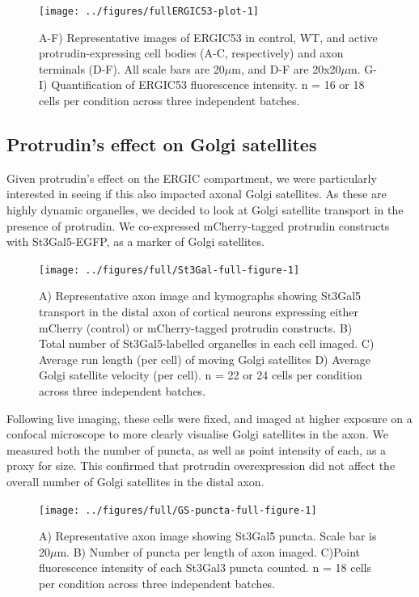 \documentclass[
  12pt,
  a4paper,
]{book}
\begin{document}
\begin{figure}
\texttt{[image: ../figures/fullERGIC53-plot-1]} \caption[ERGIC53 localisation in protrudin-expressing neurons]{A-F) Representative images of ERGIC53 in control, WT, and active protrudin-expressing cell bodies (A-C, respectively) and axon terminals (D-F).  All scale bars are 20$\mu$m, and D-F are 20x20$\mu$m.  G-I) Quantification of ERGIC53 fluorescence intensity. n = 16 or 18 cells per condition across three independent batches.}\label{fig:ERGIC53-plot}
\end{figure}

\hypertarget{protrudins-effect-on-golgi-satellites}{%
\subsection{Protrudin's effect on Golgi satellites}\label{protrudins-effect-on-golgi-satellites}}

Given protrudin's effect on the ERGIC compartment, we were particularly interested in seeing if this also impacted axonal Golgi satellites. As these are highly dynamic organelles, we decided to look at Golgi satellite transport in the presence of protrudin. We co-expressed mCherry-tagged protrudin constructs with St3Gal5-EGFP, as a marker of Golgi satellites.

\begin{figure}
\texttt{[image: ../figures/full/St3Gal-full-figure-1]} \caption[Protrudin effect on Golgi satellite (St3Gal5) transport in the distal axon]{A) Representative axon image and kymographs showing St3Gal5 transport in the distal axon of cortical neurons expressing either mCherry (control) or mCherry-tagged protrudin constructs.  B) Total number of St3Gal5-labelled organelles in each cell imaged.  C) Average run length (per cell) of moving Golgi satellites  D) Average Golgi satellite velocity (per cell).  n = 22 or 24 cells per condition across three independent batches.}\label{fig:St3Gal-full-figure}
\end{figure}

Following live imaging, these cells were fixed, and imaged at higher exposure on a confocal microscope to more clearly visualise Golgi satellites in the axon. We measured both the number of puncta, as well as point intensity of each, as a proxy for size. This confirmed that protrudin overexpression did not affect the overall number of Golgi satellites in the distal axon.

\begin{figure}
\texttt{[image: ../figures/full/GS-puncta-full-figure-1]} \caption[Protrudin effect on Golgi satellite abundance and size in the distal axon]{A) Representative axon image showing St3Gal5 puncta.  Scale bar is 20$\mu$m.  B) Number of puncta per length of axon imaged.  C)Point fluorescence intensity of each St3Gal3 puncta counted.  n = 18 cells per condition across three independent batches.}\label{fig:GS-puncta-full-figure}
\end{figure}
\end{document}
